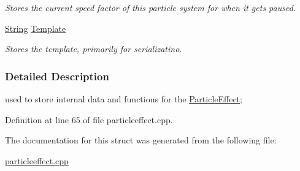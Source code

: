 \begin{DoxyCompactItemize}
\begin{DoxyCompactList}\small\item\em Stores the current speed factor of this particle system for when it gets paused. \item\end{DoxyCompactList}\item 
\hypertarget{structMezzanine_1_1internal_1_1ParticleEffectInternalData_af82532832d2413187a60cca4d20c63de}{
\hyperlink{namespaceMezzanine_acf9fcc130e6ebf08e3d8491aebcf1c86}{String} \hyperlink{structMezzanine_1_1internal_1_1ParticleEffectInternalData_af82532832d2413187a60cca4d20c63de}{Template}}
\label{structMezzanine_1_1internal_1_1ParticleEffectInternalData_af82532832d2413187a60cca4d20c63de}

\begin{DoxyCompactList}\small\item\em Stores the template, primarily for serializatino. \item\end{DoxyCompactList}\end{DoxyCompactItemize}


\subsubsection{Detailed Description}
used to store internal data and functions for the \hyperlink{classMezzanine_1_1ParticleEffect}{ParticleEffect}; 

Definition at line 65 of file particleeffect.cpp.



The documentation for this struct was generated from the following file:\begin{DoxyCompactItemize}
\item 
\hyperlink{particleeffect_8cpp}{particleeffect.cpp}\end{DoxyCompactItemize}
